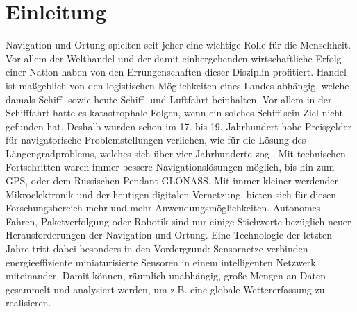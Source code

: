 \chapter{Einleitung}
\label{chap:Like Vorlage}

Navigation und Ortung spielten seit jeher eine wichtige Rolle für die Menschheit. Vor allem der Welthandel und der damit einhergehenden wirtschaftliche Erfolg einer Nation haben von den Errungenschaften dieser Disziplin profitiert. Handel ist maßgeblich von den logistischen Möglichkeiten eines Landes abhängig, welche damals Schiff- sowie heute Schiff- und Luftfahrt beinhalten. Vor allem in der Schifffahrt hatte es katastrophale Folgen, wenn ein solches Schiff sein Ziel nicht gefunden hat. Deshalb wurden schon im 17. bis 19. Jahrhundert hohe Preisgelder für navigatorische Problemstellungen verliehen, wie für die Lösung des Längengradproblems, welches sich über vier Jahrhunderte zog \cite{Sobel2000}. Mit technischen Fortschritten waren immer bessere Navigationslösungen möglich, bis hin zum \gls{GPS}, oder dem Russischen Pendant \gls{GLONASS}. Mit immer kleiner werdender Mikroelektronik und der heutigen digitalen Vernetzung, bieten sich für diesen Forschungsbereich mehr und mehr Anwendungsmöglichkeiten. Autonomes Fahren, Paketverfolgung oder Robotik sind nur einige Stichworte bezüglich neuer Herausforderungen der Navigation und Ortung. Eine Technologie der letzten Jahre tritt dabei besonders in den Vordergrund: Sensornetze verbinden energieeffiziente miniaturisierte Sensoren in einem intelligenten Netzwerk miteinander. Damit können, räumlich unabhängig, große Mengen an Daten gesammelt und analysiert werden, um z.B. eine globale Wettererfassung zu realisieren. 
